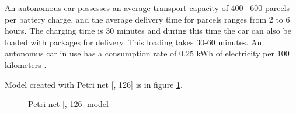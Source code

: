 \documentclass[a4paper, 11pt, a4paper]{article}
\begin{document}
An autonomous car possesses an average transport capacity of 400\,--\,600 parcels per battery charge, and the average delivery time for parcels ranges
from 2 to 6 hours. The charging time is 30 minutes and during this time the car can also be loaded with packages for delivery. This loading takes 30-60
minutes. An autonomus car in use has a consumption rate of 0.25 kWh of electricity per 100 kilometers \cite{autonomous.emissions}.

Model created with Petri net [\cite{IMS.lectures}, 126] is in figure \ref{figure:scheme}.

\begin{figure}[ht]
    \begin{center}
    \end{center}
    \caption{Petri net [\cite{IMS.lectures}, 126] model}
    \label{figure:scheme}
\end{figure}
\end{document}
